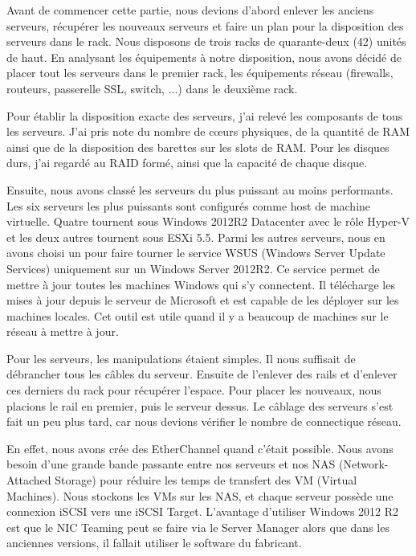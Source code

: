 Avant de commencer cette partie, nous devions d'abord enlever les anciens serveurs, récupérer les nouveaux serveurs et faire un plan pour la disposition des serveurs dans le rack.
Nous disposons de trois racks de quarante-deux (42) unités de haut. 
En analysant les équipements à notre disposition, nous avons décidé de placer tout les serveurs dans le premier rack, les équipements réseau (firewalls, routeurs, passerelle SSL, switch, ...) dans le deuxième rack. 

Pour établir la disposition exacte des serveurs, j'ai relevé les composants de tous les serveurs.
J'ai pris note du nombre de cœurs physiques, de la quantité de RAM ainsi que de la disposition des barettes sur les slots de RAM.
Pour les disques durs, j'ai regardé au RAID formé, ainsi que la capacité de chaque disque.

Ensuite, nous avons classé les serveurs du plus puissant au moins performants. 
Les six serveurs les plus puissants sont configurés comme host de machine virtuelle. 
Quatre tournent sous Windows 2012R2 Datacenter avec le rôle Hyper-V et les deux autres tournent sous ESXi 5.5.
Parmi les autres serveurs, nous en avons choisi un pour faire tourner le service WSUS (Windows Server Update Services) uniquement sur un Windows Server 2012R2. 
Ce service permet de mettre à jour toutes les machines Windows qui s'y connectent.
Il télécharge les mises à jour depuis le serveur de Microsoft et est capable de les déployer sur les machines locales.
Cet outil est utile quand il y a beaucoup de machines sur le réseau à mettre à jour. 

Pour les serveurs, les manipulations étaient simples. 
Il nous suffisait de débrancher tous les câbles du serveur.
Ensuite de l'enlever des rails et d'enlever ces derniers du rack pour récupérer l'espace.
Pour placer les nouveaux, nous placions le rail en premier, puis le serveur dessus.
Le câblage des serveurs s'est fait un peu plus tard, car nous devions vérifier le nombre de connectique réseau. 

En effet, nous avons crée des EtherChannel quand c'était possible. 
Nous avons besoin d'une grande bande passante entre nos serveurs et nos NAS (Network-Attached Storage) pour réduire les temps de transfert des VM (Virtual Machines).
Nous stockons les VMs sur les NAS, et chaque serveur possède une connexion iSCSI vers une iSCSI Target. 
L'avantage d'utiliser Windows 2012 R2 est que le NIC Teaming peut se faire via le Server Manager alors que dans les anciennes versions, il fallait utiliser le software du fabricant.

